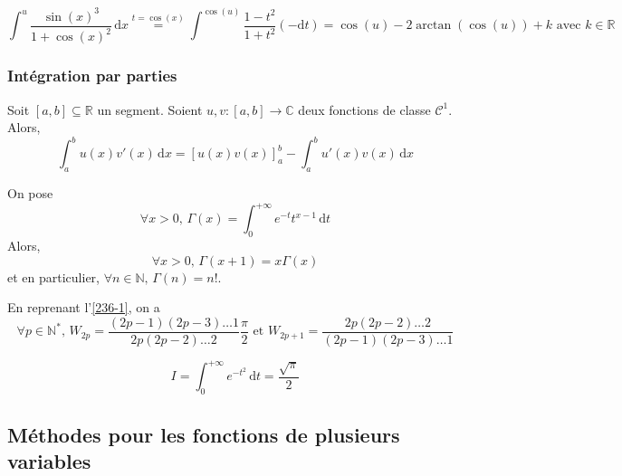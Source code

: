   \begin{example}
    \[ \int^u \frac{\sin(x)^3}{1+\cos(x)^2} \, \mathrm{d}x \overset{t = \cos(x)}{=} \int^{\cos(u)} \frac{1-t^2}{1+t^2} (-\mathrm{d}t) = \cos(u) - 2\arctan(\cos(u)) + k \text{ avec } k \in \mathbb{R} \]
  \end{example}

  \subsubsection{Intégration par parties}


  \begin{theorem}
    Soit $[a,b] \subseteq \mathbb{R}$ un segment. Soient $u, v : [a,b] \rightarrow \mathbb{C}$ deux fonctions de classe $\mathcal{C}^1$. Alors,
    \[ \int_a^b u(x)v'(x) \, \mathrm{d}x = \left[ u(x) v(x) \right]_a^b - \int_a^b u'(x) v(x) \, \mathrm{d}x \]
  \end{theorem}


  \begin{example}
    \label{236-2}
    On pose
    \[ \forall x > 0, \, \Gamma(x) = \int_0^{+\infty} e^{-t} t^{x-1} \, \mathrm{d}t \]
    Alors,
    \[ \forall x > 0, \, \Gamma(x+1) = x \Gamma(x) \]
    et en particulier, $\forall n \in \mathbb{N}, \, \Gamma(n) = n!$.
  \end{example}


  \begin{example}
    En reprenant l'\cref{236-1}, on a
    \[ \forall p \in \mathbb{N}^*, \, W_{2p} = \frac{(2p-1)(2p-3) \dots 1}{2p (2p-2) \dots 2} \frac{\pi}{2} \text{ et } W_{2p+1} = \frac{2p (2p-2) \dots 2}{(2p-1)(2p-3) \dots 1} \]
  \end{example}


  \begin{application}
    \[ I = \int_0^{+\infty} e^{-t^2} \, \mathrm{d}t = \frac{\sqrt{\pi}}{2} \]
  \end{application}

  \subsection{Méthodes pour les fonctions de plusieurs variables}

